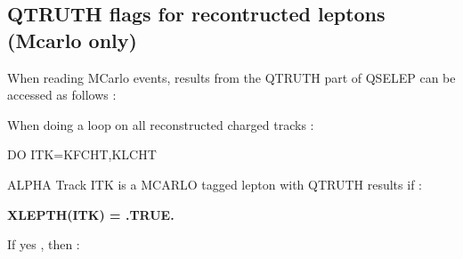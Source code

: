 \subsection{\label{sec-QSELTH}QTRUTH flags for recontructed leptons (Mcarlo only)}
\par
 
              When reading MCarlo events, results from the QTRUTH part of QSELEP
              can be accessed as follows :
 
              When doing a loop on all reconstructed charged tracks :
 
                    DO ITK=KFCHT,KLCHT
 
          ALPHA Track ITK is a MCARLO tagged lepton with QTRUTH results if :
 
            {\bf XLEPTH(ITK) = .TRUE.}
 
          If yes , then :
 
